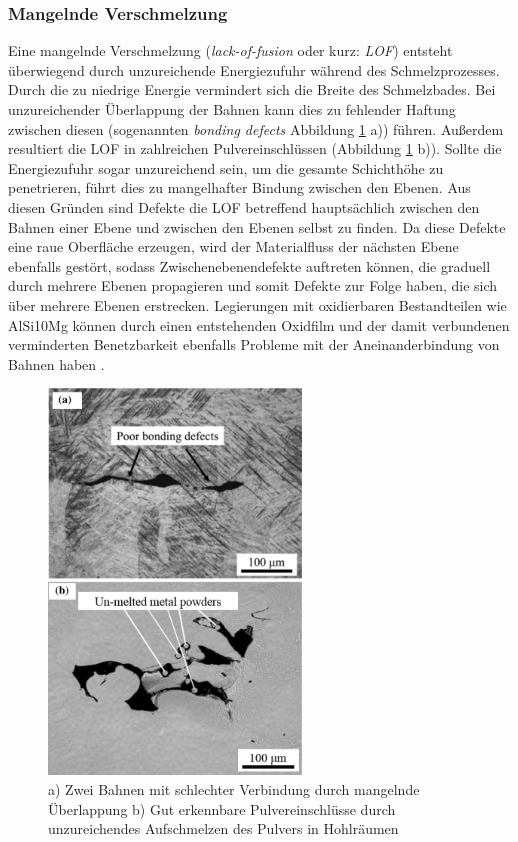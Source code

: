 		\subsubsection{Mangelnde Verschmelzung}
		Eine mangelnde Verschmelzung (\emph{lack-of-fusion} oder kurz: \emph{LOF}) entsteht
		überwiegend durch unzureichende Energiezufuhr während des Schmelzprozesses. Durch die zu
		niedrige Energie vermindert sich die Breite des Schmelzbades. Bei unzureichender
		Überlappung der Bahnen kann dies zu fehlender Haftung zwischen diesen (sogenannten
		\emph{bonding defects} Abbildung \ref{fig:defects_lof} a)) führen. Außerdem resultiert
		die LOF in zahlreichen Pulvereinschlüssen (Abbildung \ref{fig:defects_lof} b)). Sollte die
		Energiezufuhr sogar unzureichend sein, um die gesamte Schichthöhe zu penetrieren, führt
		dies zu mangelhafter Bindung zwischen den Ebenen. Aus diesen Gründen sind Defekte die
		LOF betreffend hauptsächlich zwischen den Bahnen einer Ebene und zwischen den Ebenen
		selbst zu finden. Da diese Defekte eine raue Oberfläche erzeugen, wird der Materialfluss
		der nächsten Ebene ebenfalls gestört, sodass Zwischenebenendefekte auftreten können, die
		graduell durch mehrere Ebenen propagieren und somit Defekte zur Folge haben, die sich über
		mehrere Ebenen erstrecken. Legierungen mit oxidierbaren Bestandteilen wie AlSi10Mg können
		durch einen entstehenden Oxidfilm und der damit verbundenen verminderten Benetzbarkeit
		ebenfalls Probleme mit der Aneinanderbindung von Bahnen haben \cite{zhang2017defect}.

		\begin{figure}[!ht]
			\centering
			\includegraphics[width=0.6\textwidth]{chapter/main/img/defects/lack_of_fusion.png}
			\caption{a) Zwei Bahnen mit schlechter Verbindung durch mangelnde Überlappung
			b) Gut erkennbare Pulvereinschlüsse durch unzureichendes Aufschmelzen des Pulvers
			in Hohlräumen \cite{zhang2017defect}}
			\label{fig:defects_lof}
		\end{figure}

